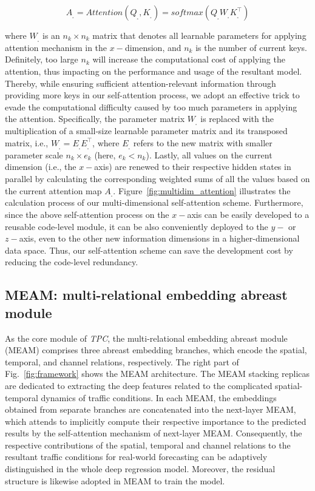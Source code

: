 \begin{equation}
    \label{eqn:attention_3}
    A_{_\square} = Attention(Q_{_\square}, K_{_\square}) = softmax(Q_{_\square} W_{_\square} K_{_\square}^\top)
\end{equation}

where $W_{_\square}$ is an $n_k \times n_k$ matrix that denotes all learnable parameters for applying attention mechanism in the $x-$dimension, and $n_k$ is the number of current keys. Definitely, too large $n_k$ will increase the computational cost of applying the attention, thus impacting on the performance and usage of the resultant model. Thereby, while ensuring sufficient attention-relevant information through providing more keys in our self-attention process, we adopt an effective trick to evade the computational difficulty caused by too much parameters in applying the attention. Specifically, the parameter matrix $W_{_\square}$ is replaced with the multiplication of a small-size learnable parameter matrix and its transposed matrix, i.e., $W_{_\square} = E_{_\square} E_{_\square}^\top$, where $E_{_\square}$ refers to the new matrix with smaller parameter scale $n_k \times e_k$ (here, $e_k < n_k$). Lastly, all values on the current dimension (i.e., the $x-$axis) are renewed to their respective hidden states in parallel by calculating the corresponding weighted sums of all the values based on the current attention map $A_{_\square}$. Figure~\ref{fig:multidim_attention} illustrates the calculation process of our multi-dimensional self-attention scheme. Furthermore, since the above self-attention process on the $x-$axis can be easily developed to a reusable code-level module, it can be also conveniently deployed to the $y-$ or $z-$axis, even to the other new information dimensions in a higher-dimensional data space. Thus, our self-attention scheme can save the development cost by reducing the code-level redundancy.

\subsection{MEAM: multi-relational embedding abreast module}
As the core module of \textit{TPC}, the multi-relational embedding abreast module (MEAM) comprises three abreast embedding branches, which encode the spatial, temporal, and channel relations, respectively. The right part of Fig.~\ref{fig:framework} shows the MEAM architecture. The MEAM stacking replicas are dedicated to extracting the deep features related to the complicated spatial-temporal dynamics of traffic conditions. In each MEAM, the embeddings obtained from separate branches are concatenated into the next-layer MEAM, which attends to implicitly compute their respective importance to the predicted results by the self-attention mechanism of next-layer MEAM. Consequently, the respective contributions of the spatial, temporal and channel relations to the resultant traffic conditions for real-world forecasting can be adaptively distinguished in the whole deep regression model. Moreover, the residual structure \cite{he2016deep} is likewise adopted in MEAM to train the model.

